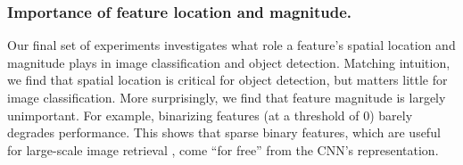 \subsubsection{Importance of feature location and magnitude.}
Our final set of experiments investigates what role a feature's spatial location and magnitude plays in image classification and object detection.
Matching intuition, we find that spatial location is critical for object detection, but matters little for image classification.
More surprisingly, we find that feature magnitude is largely unimportant.
For example, binarizing features (at a threshold of 0) barely degrades performance.
This shows that sparse binary features, which are useful for large-scale image retrieval \cite{gong2011iterative,weiss2009spectral}, come ``for free'' from the CNN's representation.


